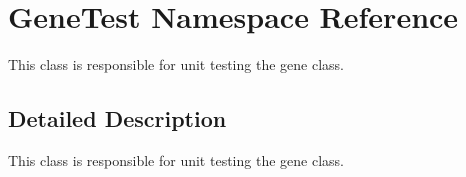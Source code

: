 \hypertarget{namespace_gene_test}{\section{Gene\+Test Namespace Reference}
\label{namespace_gene_test}
}


This class is responsible for unit testing the gene class.  




\subsection{Detailed Description}
This class is responsible for unit testing the gene class. 